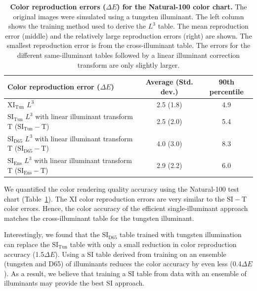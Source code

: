 \documentclass[]{spie}
\newcommand{\Lcube}{L^3}
\newcommand{\XI}{\mathrm{XI}}
\newcommand{\SI}{\mathrm{SI}}
\newcommand{\XIT}{\mathrm{XI_{Tun}}}
\newcommand{\SIT}{\mathrm{SI_{Tun}}}
\newcommand{\SID}{\mathrm{SI_{D65}}}
\newcommand{\SIE}{\mathrm{SI_{Ens}}}
\newcommand{\SIGT}{\mathrm{SI-T}}
\newcommand{\SITT}{\mathrm{SI_{Tun}-T}}
\newcommand{\SIDT}{\mathrm{SI_{D65}-T}}
\newcommand{\SIET}{\mathrm{SI_{Ens}-T}}
\newcommand{\TT}{\mathrm{T}}
\begin{document}
\begin {table}[b]
\begin{center}
\begin{tabular}{|l|c|c|}
\hline 
Color reproduction error ($\Delta E$) & Average (Std. dev.) & 90th percentile \\ \hline 
$\XIT$ $\Lcube$ & 2.5 (1.8) & 4.9 \\ 
$\SIT$ $\Lcube$ with linear illuminant transform $\TT$ ($\SITT$) & 2.5 (2.0) & 5.4 \\ 
$\SID$ $\Lcube$ with linear illuminant transform $\TT$ ($\SIDT$) & 4.0 (3.0) & 8.3 \\
$\SIE$ $\Lcube$ with linear illuminant transform $\TT$ ($\SIET$) & 2.9 (2.2) & 6.0 \\\hline 
\end{tabular} 
\end{center}\caption{\textbf{Color reproduction errors ($\Delta E$) for the Natural-100 color chart.} The original images were simulated using a tungsten illuminant. The left column shows the training method used to derive the $\Lcube$ table. The mean reproduction error (middle) and the relatively large reproduction errors (right) are shown. The smallest reproduction error is from the cross-illuminant table. The errors for the different same-illuminant tables followed by a linear illuminant correction transform are only slightly larger.} 
\label{tab:colorErrorTable} 
\end{table}

We quantified the color rendering quality accuracy using the Natural-100 test chart (Table~\ref{tab:colorErrorTable}). The $\XI$ color reproduction errors are very similar to the $\SIGT$ color errors. Hence, the color accuracy of the efficient single-illuminant approach matches the cross-illuminant table for the tungsten illuminant.

Interestingly, we found that the $\SID$ table trained with tungsten illumination can replace the $\SIT$ table with only a small reduction in color reproduction accuracy (1.5$\Delta E$). Using a $\SI$ table derived from training on an ensemble (tungsten and D65) of illuminants reduces the color accuracy by even less (0.4$\Delta E$). As a result, we believe that training a $\SI$ table from data with an ensemble of illuminants may provide the best $\SI$ approach.
\end{document}
